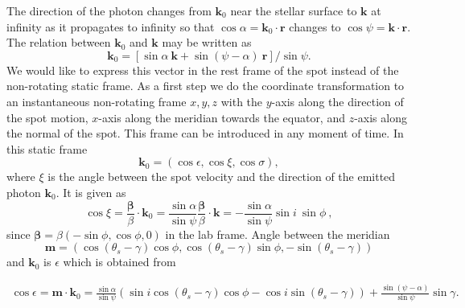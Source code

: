 \documentclass{wihuri}
\def\be{\begin{equation}}
\def\ee{\end{equation}}
\def\thetas{\theta_{s}}
\newcommand{\bmath}[1]{\boldsymbol{#1}}
\begin{document}
The direction of the photon changes from $\bmath{k}_0$ near the stellar surface to $\bmath{k}$ at infinity as it propagates to infinity so that $\cos\alpha=\bmath{k}_0\cdot\bmath{r}$
changes to $\cos\psi=\bmath{k}\cdot\bmath{r}$.
The relation between $\bmath{k}_0$ and $\bmath{k}$ may be written as
\be\label{eq:k02}
\bmath{k}_0=[ \sin\alpha\ \bmath{k} +\sin(\psi-\alpha)\ \bmath{r}]/\sin\psi.
\ee
We would like to express this vector in the rest frame of the spot instead of the non-rotating static frame. As a first step we do the coordinate transformation to an instantaneous non-rotating frame $x,y,z$ with the $y$-axis along the direction of the spot motion, $x$-axis along the meridian towards the equator, and $z$-axis along the normal of the spot. This frame can be introduced in any moment of time. In this static frame
\be 
\bmath{k}_0=
\left( 
\cos \epsilon,
\cos\xi, 
\cos\sigma
\right) ,
\ee 
where $\xi$ is the angle  between the spot velocity and the direction of the emitted photon $\bmath{k}_0$. It is given as   
\be \label{eq:cosxi22}
\cos\xi=\frac{\bmath{\beta}}{\beta} \cdot \bmath{k}_0
=\frac{\sin\alpha}{\sin\psi} \frac{\bmath{\beta}}{\beta} \cdot \bmath{k}=
- \frac{\sin\alpha}{\sin\psi}\sin i\ \sin\phi\ ,
\ee
since $\bmath{\beta} = \beta(-\sin\phi,\cos\phi,0)$ in the lab frame. Angle between the meridian %
\be
 \bmath{m} = (\cos(\thetas - \gamma)\cos \phi ,\cos (\thetas -\gamma)\sin \phi, -\sin (\thetas -\gamma))
\ee
and $\bmath{k}_0$ is $\epsilon$ which is obtained from 

\be \label{eq:kx-comp}
\begin{split}
\cos\epsilon= \bmath{m} \cdot \bmath{k}_0
=\frac{\sin\alpha}{\sin\psi} (\sin i \cos(\thetas -\gamma)\cos \phi -\cos i \sin (\thetas -\gamma))
+ \frac{\sin (\psi - \alpha)}{\sin \psi}\sin\gamma.
\end{split}
\ee
\end{document}
